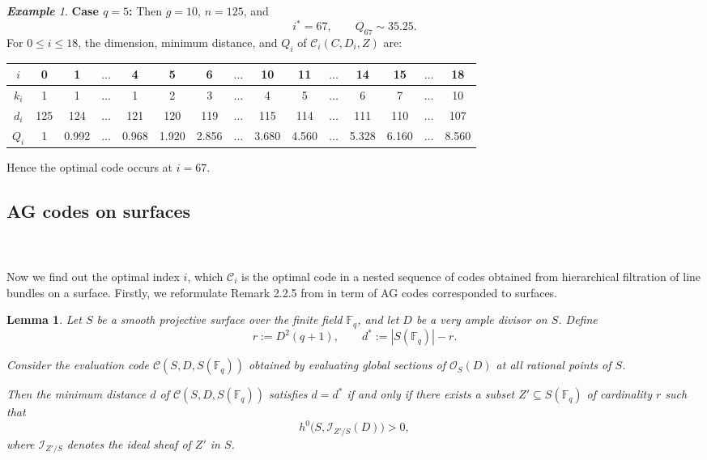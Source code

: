 \documentclass[14pt]{amsart}
\theoremstyle{plain}
\newtheorem{lem}[thm]{\bf Lemma}
\theoremstyle{definition}
\theoremstyle{remark}
\newtheorem{exam}[thm]{\bf Example}
\theoremstyle{example}
\def \C{\mathcal{C}}
\begin{document}
\begin{exam}
\medskip\noindent
\textbf{Case $q=5$:} Then $g=10$, $n=125$, and
$$
i^* = 67, \qquad Q_{67} \sim 35.25.
$$
For $0\le i \le 18$, the dimension, minimum distance, and $Q_i$ of $\C_i(C,D_i,Z)$ are:

{\tiny
\begin{center}
\begin{tabular}{c | c c c c c c c c c c c c c c}			
  $i$     & 0 & 1 & $\dots$ & 4 & 5 & 6 & $\dots$ & 10 & 11 & $\dots$ & 14 & 15 & $\dots$ & 18 \\
  \hline
  $k_i$ & 1 & 1 & $\dots$ & 1 & 2 & 3 & $\dots$ & 4 & 5 & $\dots$ & 6 & 7 & $\dots$ & 10 \\
  $d_i$ & 125 & 124 & $\dots$ & 121 & 120 & 119 & $\dots$ & 115 & 114 & $\dots$ & 111 & 110 & $\dots$ & 107 \\
  $Q_i$ & 1 & 0.992 & $\dots$ & 0.968 & 1.920 & 2.856 & $\dots$ & 3.680 & 4.560 & $\dots$ & 5.328 & 6.160 & $\dots$ & 8.560 \\
\end{tabular}
\end{center}
}
Hence the optimal code occurs at $i=67$.
\end{exam}


\subsection*{AG codes on surfaces}
\ \\ \\
Now we find out the optimal index $i$, which $\C_i$ is the optimal code in a nested sequence of codes obtained from hierarchical filtration of line bundles on a surface. Firstly, we reformulate Remark 2.2.5 from \cite{St} in term of AG codes corresponded to surfaces.

\begin{lem}
\label{lem:surface-des-dist-refined}
Let $S$ be a smooth projective surface over the finite field $\mathbb{F}_q$, and let $D$ be a very ample divisor on $S$. Define
\[
r := D^2 (q+1), \qquad d^* := |S(\mathbb{F}_q)| - r.
\]

Consider the evaluation code $\mathcal{C}(S,D,S(\mathbb{F}_q))$ obtained by evaluating global sections of $\mathcal{O}_S(D)$ at all rational points of $S$.

Then the minimum distance $d$ of $\mathcal{C}(S,D,S(\mathbb{F}_q))$ satisfies $d = d^*$ if and only if there exists a subset $Z' \subseteq S(\mathbb{F}_q)$ of cardinality $r$ such that
\[
h^0\big(S, \mathcal{I}_{Z'/S}(D)\big) > 0,
\]
where $\mathcal{I}_{Z'/S}$ denotes the ideal sheaf of $Z'$ in $S$.
\end{lem}
\end{document}
